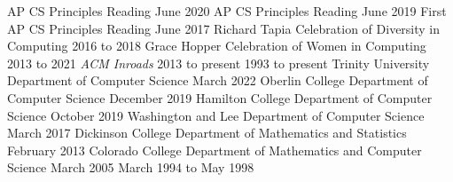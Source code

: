 
\begin{cventries}

    {AP CS Principles Reading}
    {June 2020}
    {AP CS Principles Reading}
    {June 2019}
    {First AP CS Principles Reading}
    {June 2017}
    {Richard Tapia Celebration of Diversity in Computing}
    {2016 to 2018}
    {Grace Hopper Celebration of Women in Computing}
    {2013 to 2021}
    {\textsl{ACM Inroads}}
    {2013 to present}
    {}
    {1993 to present}
    {Trinity University Department of Computer Science}
    {March 2022}
    {Oberlin College Department of Computer Science}
    {December 2019}
    {Hamilton College Department of Computer Science}
    {October 2019}
    {Washington and Lee Department of Computer Science}
    {March 2017}
    {Dickinson College Department of Mathematics and Statistics}
    {February 2013}
    {Colorado College Department of Mathematics and Computer Science}
    {March 2005}
    {}
    {March 1994 to May 1998}

\end{cventries}

